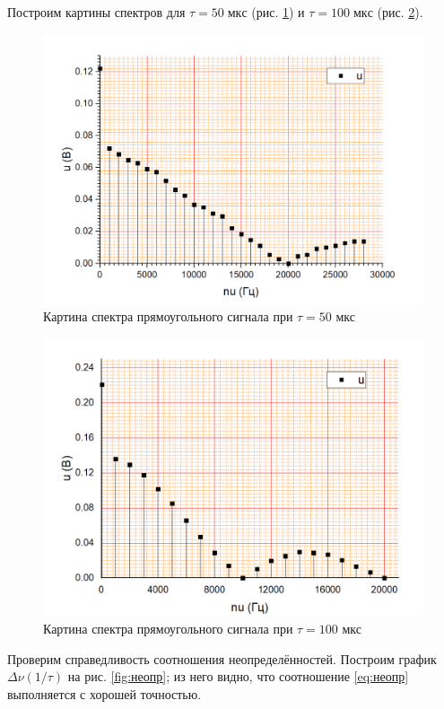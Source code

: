 \documentclass[a4paper]{article}
\begin{document}
Построим картины спектров для $ \tau  =  50\; мкс $ (рис. \ref{fig:1-50}) и $ \tau = 100\; мкс $ (рис. \ref{fig:1-100}).

\begin{figure}[p]
	\centering
	\includegraphics[width=0.8\linewidth]{"1кгц 50мкс"}
	\caption{Картина спектра прямоугольного сигнала при $\tau = 50$ мкс}
	\label{fig:1-50}
\end{figure}

\begin{figure}[p]
	\centering
	\includegraphics[width=0.8\linewidth]{"1кгц 100мкс"}
	\caption{Картина спектра прямоугольного сигнала при $\tau = 100$ мкс}
	\label{fig:1-100}
\end{figure}

Проверим справедливость соотношения неопределённостей. Построим график $ \Delta \nu (1/\tau) $ на рис. \ref{fig:неопр}; из него видно, что соотношение \eqref{eq:неопр} выполняется с хорошей точностью.
\end{document}
